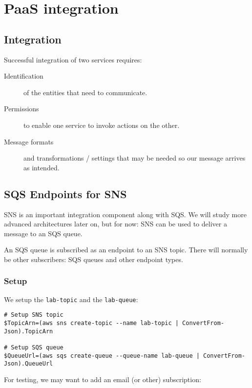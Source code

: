 \chapter{PaaS integration}
\label{ch:paas-integration}

\section{Integration}
\label{integration}

Successful integration of two services requires:

\begin{description}
\item[Identification]
of the entities that need to communicate.
\item[Permissions]
to enable one service to invoke actions on the other.
\item[Message formats]
and transformations / settings that may be needed so our message arrives
as intended.
\end{description}

\section{SQS Endpoints for SNS}\label{sqs-endpoints-for-sns}

SNS is an important integration component along with SQS. We will study
more advanced architectures later on, but for now: SNS can be used to
deliver a message to an SQS queue.

An SQS queue is subscribed as an endpoint to an SNS topic. There will
normally be other subscribers: SQS queues and other endpoint types.

\subsection{Setup}\label{setup}

We setup the \texttt{lab-topic} and the \texttt{lab-queue}:

\begin{verbatim}
# Setup SNS topic
$TopicArn=(aws sns create-topic --name lab-topic | ConvertFrom-Json).TopicArn

# Setup SQS queue
$QueueUrl=(aws sqs create-queue --queue-name lab-queue | ConvertFrom-Json).QueueUrl
\end{verbatim}

For testing, we may want to add an email (or other) subscription:

